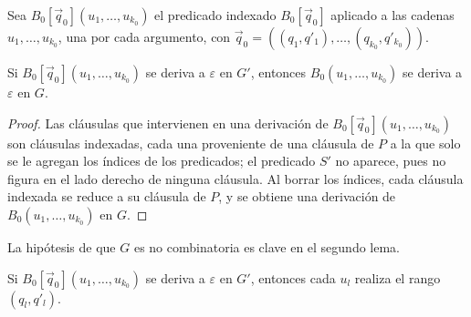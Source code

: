 Sea $B_0[\vec q_0](u_1, \ldots, u_{k_0})$ el predicado indexado $B_0[\vec q_0]$
aplicado a las cadenas $u_1, \ldots, u_{k_0}$, una por cada argumento, con
$\vec q_0 = ((q_1, q'_1), \ldots, (q_{k_0}, q'_{k_0}))$.

\begin{lema}\label{lema:proyeccion}
Si $B_0[\vec q_0](u_1, \ldots, u_{k_0})$ se deriva a $\varepsilon$ en $G'$,
entonces $B_0(u_1, \ldots, u_{k_0})$ se deriva a $\varepsilon$ en $G$.
\end{lema}

\begin{proof}
Las cláusulas que intervienen en una derivación de
$B_0[\vec q_0](u_1, \ldots, u_{k_0})$ son cláusulas indexadas, cada una
proveniente de una cláusula de $P$ a la que solo se le agregan los
índices de los predicados; el predicado $S'$ no aparece, pues no figura
en el lado derecho de ninguna cláusula. Al borrar los índices, cada cláusula
indexada se reduce a su cláusula de $P$, y se obtiene una derivación de
$B_0(u_1, \ldots, u_{k_0})$ en $G$.
\end{proof}

La hipótesis de que $G$ es no combinatoria es clave en el segundo lema.

\begin{lema}\label{lema:realizacion}
Si $B_0[\vec q_0](u_1, \ldots, u_{k_0})$ se deriva a $\varepsilon$ en $G'$,
entonces cada $u_l$ realiza el rango $(q_l, q'_l)$.
\end{lema}

